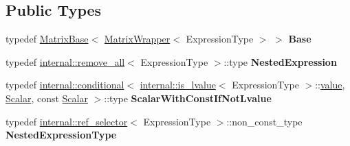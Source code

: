 \subsection*{Public Types}
\begin{DoxyCompactItemize}
\item 
\mbox{\label{class_eigen_1_1_matrix_wrapper_a4965287f4ee5f6c87bb8e599ebb85a95}} 
typedef \mbox{\hyperlink{class_eigen_1_1_matrix_base}{Matrix\+Base}}$<$ \mbox{\hyperlink{class_eigen_1_1_matrix_wrapper}{Matrix\+Wrapper}}$<$ Expression\+Type $>$ $>$ {\bfseries Base}
\item 
\mbox{\label{class_eigen_1_1_matrix_wrapper_a69014bfe285cf528056ad468a4171d32}} 
typedef \mbox{\hyperlink{struct_eigen_1_1internal_1_1remove__all}{internal\+::remove\+\_\+all}}$<$ Expression\+Type $>$\+::type {\bfseries Nested\+Expression}
\item 
\mbox{\label{class_eigen_1_1_matrix_wrapper_ae67ffe9584e383b0966a05e5f6f4657e}} 
typedef \mbox{\hyperlink{struct_eigen_1_1internal_1_1conditional}{internal\+::conditional}}$<$ \mbox{\hyperlink{struct_eigen_1_1internal_1_1is__lvalue}{internal\+::is\+\_\+lvalue}}$<$ Expression\+Type $>$\+::\mbox{\hyperlink{class_eigen_1_1_dense_base_a8da735a6bfc7012606acf787156d10a0}{value}}, \mbox{\hyperlink{class_eigen_1_1_dense_base_a5feed465b3a8e60c47e73ecce83e39a2}{Scalar}}, const \mbox{\hyperlink{class_eigen_1_1_dense_base_a5feed465b3a8e60c47e73ecce83e39a2}{Scalar}} $>$\+::type {\bfseries Scalar\+With\+Const\+If\+Not\+Lvalue}
\item 
\mbox{\label{class_eigen_1_1_matrix_wrapper_adde79f48c3c446ad7f05efc79f301986}} 
typedef \mbox{\hyperlink{struct_eigen_1_1internal_1_1ref__selector}{internal\+::ref\+\_\+selector}}$<$ Expression\+Type $>$\+::non\+\_\+const\+\_\+type {\bfseries Nested\+Expression\+Type}
\end{DoxyCompactItemize}
